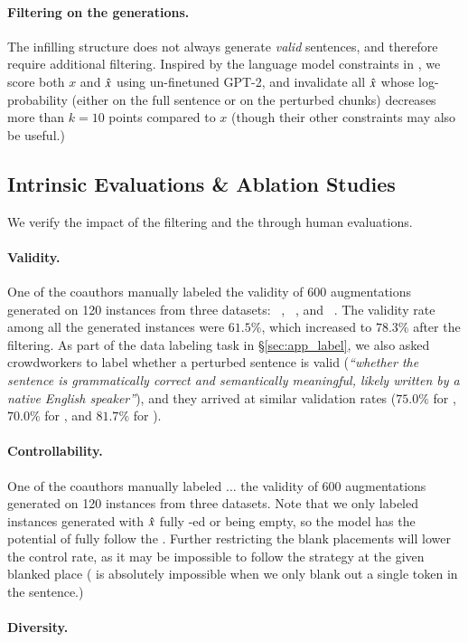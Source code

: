 \paragraph{Filtering on the generations.}
The infilling structure does not always generate \emph{valid} sentences, and therefore require additional filtering.
Inspired by the language model constraints in \citet{morris2020textattack}, we score both $x$ and $\hat{x}$ using un-finetuned GPT-2, and invalidate all $\hat{x}$ whose log-probability (either on the full sentence or on the perturbed chunks) decreases more than $k=10$ points compared to $x$ (though their other constraints may also be useful.)




\subsection{Intrinsic Evaluations \& Ablation Studies}
We verify the impact of the filtering and the \tagstrs through human evaluations.
\paragraph{Validity.}
One of the coauthors manually labeled the validity of 600 augmentations generated on 120 instances from three datasets: \dsst~\cite{socher2013recursive}, \dnli~\cite{bowman-etal-2015-large}, and \dqqp~\cite{wang2018glue}.
The validity rate among all the generated instances were $61.5\%$, which increased to $78.3\%$ after the filtering. 
As part of the data labeling task in \S\ref{sec:app_label}, we also asked crowdworkers to label whether a perturbed sentence is valid (\emph{``whether the sentence is grammatically correct and semantically meaningful, likely written by a native English speaker''}), and they arrived at similar validation rates ($75.0\%$ for \dsst, $70.0\%$ for \dqqp, and $81.7\%$ for \dnli).


\paragraph{Controllability.}
One of the coauthors manually labeled ...
the validity of 600 augmentations generated on 120 instances from three datasets.
Note that we only labeled instances generated with $\hat{x}$ fully \BLANK-ed or being empty, so the model has the potential of fully follow the \tagstrs.
Further restricting the blank placements will lower the control rate, as it may be impossible to follow the strategy at the given blanked place (\eg {} is absolutely impossible when we only blank out a single token in the sentence.)



\paragraph{Diversity.}






